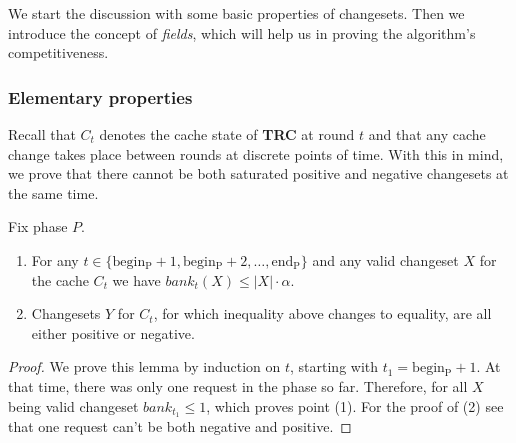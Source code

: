 We start the discussion with some basic properties of changesets. Then we
introduce the concept of \textit{fields}, which will help us in proving 
the algorithm's competitiveness.

\subsubsection{Elementary properties} Recall that $C_t$ denotes the cache state
of \textbf{TRC} at round $t$ and that any cache change takes place between
rounds at discrete points of time. With this in mind, we prove that there
cannot be both saturated positive and negative changesets at the same time.
\begin{lemma} \label{thm:lemma1} Fix phase $P$.
\begin{enumerate}[label=(\arabic*)] \item For any $t \in \{\mathrm{begin_P} +1,
\mathrm{begin_P} + 2, \ldots, \mathrm{end_P}\}$ and any valid changeset $X$ for
the cache $C_t$ we have $bank_t(X) \leq |X| \cdot \alpha$.  \item Changesets $Y$
for $C_t$, for which inequality above changes to equality, are all either
positive or negative.  \end{enumerate} \end{lemma} \begin{proof} We prove this
lemma by induction on $t$, starting with $t_1 = \mathrm{begin_P} +1$. At that
time, there was only one request in the phase so far. Therefore, for all $X$
being valid changeset $bank_{t_1} \leq 1$, which proves point (1). For the proof
of (2) see that one request can't be both negative and positive.


\end{proof}
